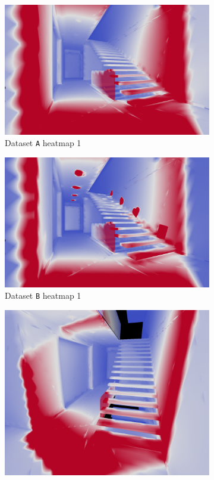 \begin{figure}
	\centering
	\begin{subfigure}[t]{0.49\linewidth}
		\includegraphics[width=\textwidth]{chapters/chapter_results/a_heatmap1}
		\caption{Dataset \texttt{A} heatmap 1}
	\end{subfigure}
	\begin{subfigure}[t]{0.49\linewidth}
		\includegraphics[width=\textwidth]{chapters/chapter_results/b_heatmap1}
		\caption{Dataset \texttt{B} heatmap 1}
	\end{subfigure}
	\begin{subfigure}[t]{0.49\linewidth}
		\includegraphics[width=\textwidth]{chapters/chapter_results/a_heatmap2}

\end{subfigure}
\end{figure}
